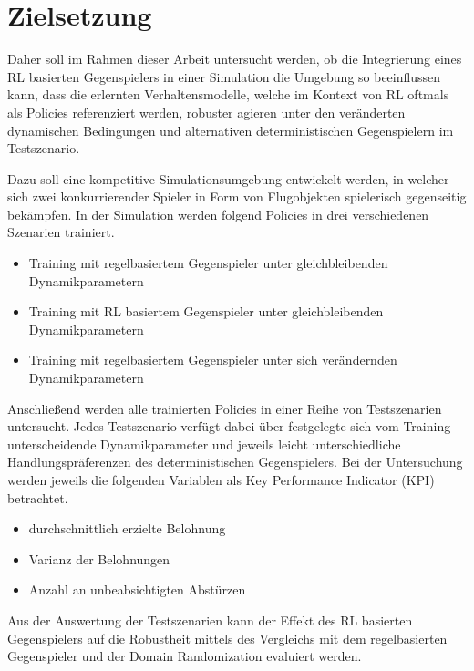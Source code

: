 \section{Zielsetzung}

Daher soll im Rahmen dieser Arbeit untersucht werden, ob die Integrierung eines RL basierten Gegenspielers in einer Simulation die Umgebung so beeinflussen kann, dass die erlernten Verhaltensmodelle, welche im Kontext von RL oftmals als Policies referenziert werden, robuster agieren unter den veränderten dynamischen Bedingungen und alternativen deterministischen Gegenspielern im Testszenario. 

Dazu soll eine kompetitive Simulationsumgebung entwickelt werden, in welcher sich zwei konkurrierender Spieler in Form von Flugobjekten spielerisch gegenseitig bekämpfen.
In der Simulation werden folgend Policies in drei verschiedenen Szenarien trainiert.

\begin{itemize}
    \item Training mit regelbasiertem Gegenspieler unter gleichbleibenden Dynamikparametern
    \item Training mit RL basiertem Gegenspieler unter gleichbleibenden Dynamikparametern
    \item Training mit regelbasiertem Gegenspieler unter sich verändernden Dynamikparametern
\end{itemize}

Anschließend werden alle trainierten Policies in einer Reihe von Testszenarien untersucht.
Jedes Testszenario verfügt dabei über festgelegte sich vom Training unterscheidende Dynamikparameter und jeweils leicht unterschiedliche Handlungspräferenzen des deterministischen Gegenspielers.
Bei der Untersuchung werden jeweils die folgenden Variablen als Key Performance Indicator (KPI) betrachtet.
\begin{itemize}
    \item durchschnittlich erzielte Belohnung
    \item Varianz der Belohnungen
    \item Anzahl an unbeabsichtigten Abstürzen
\end{itemize}

Aus der Auswertung der Testszenarien kann der Effekt des RL basierten Gegenspielers auf die Robustheit mittels des Vergleichs mit dem regelbasierten Gegenspieler und der Domain Randomization evaluiert werden.

